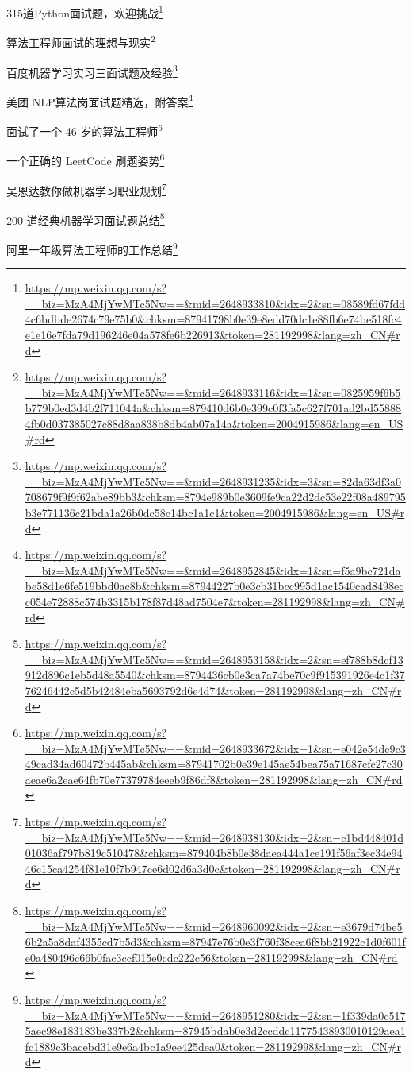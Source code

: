 \documentclass[]{ctexbook}
\renewcommand{\href}[2]{#2\footnote{\url{#1}}}
\begin{document}
\href{https://mp.weixin.qq.com/s?__biz=MzA4MjYwMTc5Nw==\&mid=2648933810\&idx=2\&sn=08589fd67fdd4c6bdbde2674c79e75b0\&chksm=87941798b0e39e8edd70dc1e88fb6e74be518fc4e1e16e7fda79d196246e04a578fe6b226913\&token=281192998\&lang=zh_CN\#rd}{315道Python面试题，欢迎挑战}

\href{https://mp.weixin.qq.com/s?__biz=MzA4MjYwMTc5Nw==\&mid=2648933116\&idx=1\&sn=0825959f6b5b779b0ed3d4b2f711044a\&chksm=879410d6b0e399c0f3fa5c627f701ad2bd558884fb0d037385027c88d8aa838b8db4ab07a14a\&token=2004915986\&lang=en_US\#rd}{算法工程师面试的理想与现实}

\href{https://mp.weixin.qq.com/s?__biz=MzA4MjYwMTc5Nw==\&mid=2648931235\&idx=3\&sn=82da63df3a0708679f9f9f62abe89bb3\&chksm=8794e989b0e3609fe9ca22d2dc53e22f08a489795b3e771136c21bda1a26b0dc58c14bc1a1c1\&token=2004915986\&lang=en_US\#rd}{百度机器学习实习三面试题及经验}

\href{https://mp.weixin.qq.com/s?__biz=MzA4MjYwMTc5Nw==\&mid=2648952845\&idx=1\&sn=f5a9bc721dabe58d1e6fe519bbd0ac8b\&chksm=87944227b0e3cb31bcc995d1ac1540cad8498ecc054e72888c574b3315b178f87d48ad7504e7\&token=281192998\&lang=zh_CN\#rd}{美团 NLP算法岗面试题精选，附答案}

\href{https://mp.weixin.qq.com/s?__biz=MzA4MjYwMTc5Nw==\&mid=2648953158\&idx=2\&sn=ef788b8dcf13912d896c1eb5d48a5540\&chksm=8794436cb0e3ca7a74be70c9f915391926e4c1f3776246442c5d5b42484eba5693792d6e4d74\&token=281192998\&lang=zh_CN\#rd}{面试了一个 46 岁的算法工程师}

\href{https://mp.weixin.qq.com/s?__biz=MzA4MjYwMTc5Nw==\&mid=2648933672\&idx=1\&sn=e042e54dc9c349cad34ad60472b445ab\&chksm=87941702b0e39e145ae54bea75a71687cfc27c30aeae6a2eae64fb70e77379784eeeb9f86df8\&token=281192998\&lang=zh_CN\#rd}{一个正确的 LeetCode 刷题姿势}

\href{https://mp.weixin.qq.com/s?__biz=MzA4MjYwMTc5Nw==\&mid=2648938130\&idx=2\&sn=c1bd448401d01036af797b819c510478\&chksm=879404b8b0e38daea444a1ce191f56af3ec34e9446c15ca4254f81e10f7b947ce6d02d6a3d0c\&token=281192998\&lang=zh_CN\#rd}{吴恩达教你做机器学习职业规划}

\href{https://mp.weixin.qq.com/s?__biz=MzA4MjYwMTc5Nw==\&mid=2648960092\&idx=2\&sn=e3679d74be56b2a5a8daf4355cd7b5d3\&chksm=87947e76b0e3f760f38cea6f8bb21922c1d0f601fe0a480496c66b0fac3ccf015e0cdc222c56\&token=281192998\&lang=zh_CN\#rd}{200 道经典机器学习面试题总结}

\href{https://mp.weixin.qq.com/s?__biz=MzA4MjYwMTc5Nw==\&mid=2648951280\&idx=2\&sn=1f339da0c5175aec98e183183be337b2\&chksm=87945bdab0e3d2ccddc11775438930010129aea1fc1889c3bacebd31e9e6a4bc1a9ee425dea0\&token=281192998\&lang=zh_CN\#rd}{阿里一年级算法工程师的工作总结}
\end{document}
